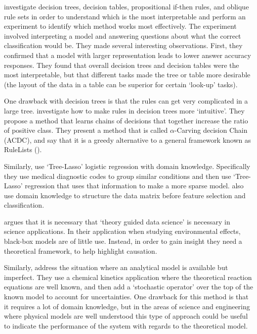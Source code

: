     \citet{Huysmans2011-th} investigate decision trees, decision tables, propositional if-then rules, and oblique rule sets in order to understand which is the most interpretable and perform an experiment to identify which method works most effectively. The experiment involved interpreting a model and answering questions about what the correct classification would be. They made several interesting observations. First, they confirmed that a model with larger representation leads to lower answer accuracy responses. They found that overall decision trees and decision tables were the most interpretable, but that different tasks made the tree or table more desirable (the layout of the data in a table can be superior for certain `look-up' tasks).

    One drawback with decision trees is that the rules can get very complicated in a large tree. \citet{Park2016-ld} investigate how to make rules in decision trees more `intuitive'. They propose a method that learns chains of decisions that together increase the ratio of positive class. They present a method that is called $\alpha$-Carving decision Chain (ACDC), and say that it is a greedy alternative to a general framework known as RuleLists (\citet{Wang2015-ww}). 


    Similarly, \citet{Jovanovic2016-gw} use `Tree-Lasso' logistic regression with domain knowledge. Specifically they use medical diagnostic codes to group similar conditions and then use `Tree-Lasso' regression that uses that information to make a more sparse model. \citet{Zycinski2012-jj} also use domain knowledge to structure the data matrix before feature selection and classification. 

    \citet{Faghmous2014-og} argues that it is necessary that `theory guided data science' is necessary in science applications. In their application when studying environmental effects, black-box models are of little use. Instead, in order to gain insight they need a theoretical framework, to help highlight causation.

    Similarly, \citet{Morrison2016-fz} address the situation where an analytical model is available but imperfect. They use a chemical kinetics application where the theoretical reaction equations are well known, and then add a `stochastic operator' over the top of the known model to account for uncertainties. One drawback for this method is that it requires a lot of domain knowledge, but in the areas of science and engineering where physical models are well understood this type of approach could be useful to indicate the performance of the system with regards to the theoretical model.

